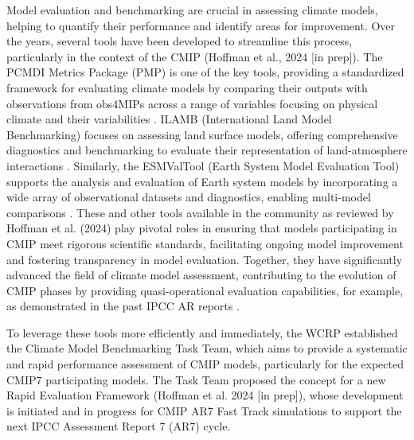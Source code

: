 \documentclass[gmd, preprint]{copernicus}
\begin{document}
Model evaluation and benchmarking are crucial in assessing climate models, helping to quantify their performance and identify areas for improvement. Over the years, several tools have been developed to streamline this process, particularly in the context of the CMIP (Hoffman et al., 2024 [in prep]). The PCMDI Metrics Package (PMP) is one of the key tools, providing a standardized framework for evaluating climate models by comparing their outputs with observations from obs4MIPs across a range of variables focusing on physical climate and their variabilities \citep{gleckler_more_2016,lee_systematic_2024}. ILAMB (International Land Model Benchmarking) focuses on assessing land surface models, offering comprehensive diagnostics and benchmarking to evaluate their representation of land-atmosphere interactions \citep{collier_international_2018}. Similarly, the ESMValTool (Earth System Model Evaluation Tool) supports the analysis and evaluation of Earth system models by incorporating a wide array of observational datasets and diagnostics, enabling multi-model comparisons \citep{eyring_overview_2016}. These and other tools available in the community as reviewed by Hoffman et al. (2024) play pivotal roles in ensuring that models participating in CMIP meet rigorous scientific standards, facilitating ongoing model improvement and fostering transparency in model evaluation. Together, they have significantly advanced the field of climate model assessment, contributing to the evolution of CMIP phases by providing quasi-operational evaluation capabilities, for example, as demonstrated in the past IPCC AR reports \citep{mcavaney_model_2001,flato_evaluation_2013,eyring_human_2021}.

To leverage these tools more efficiently and immediately, the WCRP established the Climate Model Benchmarking Task Team, which aims to provide a systematic and rapid performance assessment of CMIP models, particularly for the expected CMIP7 participating models. The Task Team proposed the concept for a new Rapid Evaluation Framework (Hoffman et al. 2024 [in prep]), whose development is initiated and in progress for CMIP AR7 Fast Track simulations to support the next IPCC Assessment Report 7 (AR7) cycle.
\end{document}
